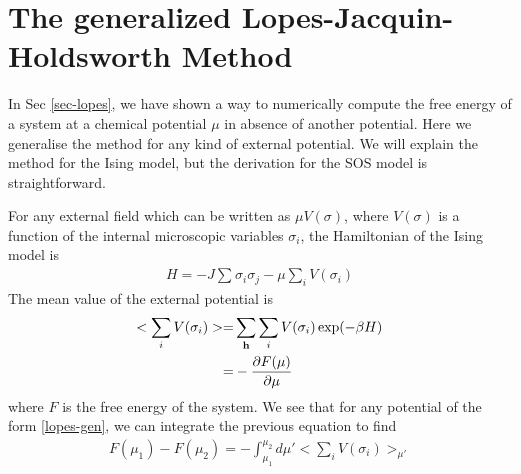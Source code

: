 \section{The generalized Lopes-Jacquin-Holdsworth Method}
\label{gen-lopes}
{\color{blue}
In Sec \ref{sec-lopes}, we have shown a way to numerically compute the free energy of a system at a chemical potential $\mu$ in absence of another potential. Here we generalise the method for any kind of external potential. We will explain the method for the Ising model, but the derivation for the SOS model is straightforward.

For any external field which can be written as $\mu V(\sigma)$, where $V(\sigma)$ is a function of the internal microscopic variables $\sigma_i$,  the Hamiltonian of the Ising model is
\begin{align}
H = - J \sum_{} \sigma_i \sigma_j - \mu \sum_i V(\sigma_i)
\end{align}
The mean value of the external potential is
\begin{align}
    <  \sum_i V(\sigma_i) > =&  \sum_{\bf h} \sum_i V(\sigma_i) \exp(-\beta H) \nonumber \\
    =&  - \frac{\partial F(\mu)}{\partial \mu}
\end{align}
where $F$ is the free energy of the system. We see that for any potential of the form \eqref{lopes-gen}, we can integrate the previous equation to find
\begin{align}
   F(\mu_1) - F(\mu_2) = - \int_{\mu_1}^{\mu_2} d\mu'  < \sum_i V(\sigma_i) >_{\mu'} 
   \label{lopes-gen}
\end{align}

}
